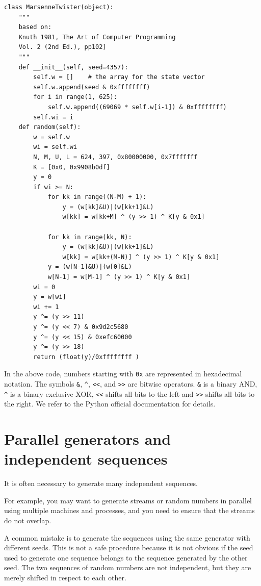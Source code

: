 \documentclass[justified, sixbynine]{tufte-book}
\def\ft{\small\tt}
\theoremstyle{plain}%
\newtheorem * {corollary}{Corollary}
\theoremstyle{definition}
\theoremstyle{remark}
\newtheorem * {remark}{Remark}
\newtheorem * {note}{Note}
\begin{document}
\begin{fullwidth}
\begin{lstlisting}[caption={in file: {\ft nlib.py}}]
class MarsenneTwister(object):
    """
    based on:
    Knuth 1981, The Art of Computer Programming
    Vol. 2 (2nd Ed.), pp102]
    """
    def __init__(self, seed=4357):
        self.w = []    # the array for the state vector
        self.w.append(seed & 0xffffffff)
        for i in range(1, 625):
            self.w.append((69069 * self.w[i-1]) & 0xffffffff)
        self.wi = i
    def random(self):
        w = self.w
        wi = self.wi
        N, M, U, L = 624, 397, 0x80000000, 0x7fffffff
        K = [0x0, 0x9908b0df]
        y = 0
        if wi >= N:
            for kk in range((N-M) + 1):
                y = (w[kk]&U)|(w[kk+1]&L)
                w[kk] = w[kk+M] ^ (y >> 1) ^ K[y & 0x1]

            for kk in range(kk, N):
                y = (w[kk]&U)|(w[kk+1]&L)
                w[kk] = w[kk+(M-N)] ^ (y >> 1) ^ K[y & 0x1]
            y = (w[N-1]&U)|(w[0]&L)
            w[N-1] = w[M-1] ^ (y >> 1) ^ K[y & 0x1]
        wi = 0
        y = w[wi]
        wi += 1
        y ^= (y >> 11)
        y ^= (y << 7) & 0x9d2c5680
        y ^= (y << 15) & 0xefc60000
        y ^= (y >> 18)
        return (float(y)/0xffffffff )
\end{lstlisting}

In the above code, numbers starting with \verb!0x! are represented in hexadecimal notation. The symbols \verb!&!, \verb!^!, \verb!<<!, and \verb!>>! are bitwise operators. \verb!&! is a binary AND,  \verb!^! is a binary exclusive XOR,  \verb!<<! shifts all bits to the left and  \verb!>>! shifts all bits to the right. We refer to the Python official documentation for details.

\goodbreak\section{Parallel generators and independent sequences}

It is often necessary to generate many independent sequences.

For example, you may want to generate streams or random numbers in parallel using multiple machines and processes, and you need to ensure that the streams do not overlap.

A common mistake is to generate the sequences using the same
generator with different seeds. This is not a safe procedure because it is
not obvious if the seed used to generate one sequence belongs to the
sequence generated by the other seed. The two
sequences of random numbers are not independent, but they are merely
shifted in respect to each other.


\end{fullwidth}
\end{document}
